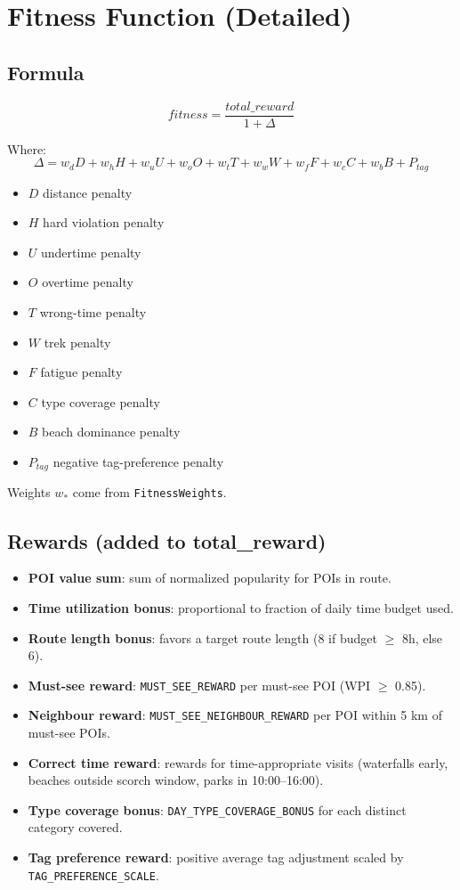 \documentclass[11pt]{article}
\begin{document}
\section{Fitness Function (Detailed)}

\subsection{Formula}
\[
fitness = \frac{total\_reward}{1 + \Delta}
\]

Where:
\[
\Delta = w_d D + w_h H + w_u U + w_o O + w_t T + w_w W + w_f F + w_c C + w_b B + P_{tag}
\]

\begin{itemize}
  \item $D$ distance penalty
  \item $H$ hard violation penalty
  \item $U$ undertime penalty
  \item $O$ overtime penalty
  \item $T$ wrong-time penalty
  \item $W$ trek penalty
  \item $F$ fatigue penalty
  \item $C$ type coverage penalty
  \item $B$ beach dominance penalty
  \item $P_{tag}$ negative tag-preference penalty
\end{itemize}

Weights $w_*$ come from \texttt{FitnessWeights}.

\subsection{Rewards (added to total\_reward)}
\begin{itemize}
  \item \textbf{POI value sum}: sum of normalized popularity for POIs in route.
  \item \textbf{Time utilization bonus}: proportional to fraction of daily time budget used.
  \item \textbf{Route length bonus}: favors a target route length (8 if budget $\geq$ 8h, else 6).
  \item \textbf{Must-see reward}: \texttt{MUST\_SEE\_REWARD} per must-see POI (WPI $\geq$ 0.85).
  \item \textbf{Neighbour reward}: \texttt{MUST\_SEE\_NEIGHBOUR\_REWARD} per POI within 5 km of must-see POIs.
  \item \textbf{Correct time reward}: rewards for time-appropriate visits (waterfalls early, beaches outside scorch window, parks in 10:00--16:00).
  \item \textbf{Type coverage bonus}: \texttt{DAY\_TYPE\_COVERAGE\_BONUS} for each distinct category covered.
  \item \textbf{Tag preference reward}: positive average tag adjustment scaled by \texttt{TAG\_PREFERENCE\_SCALE}.
\end{itemize}
\end{document}
